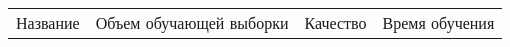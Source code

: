\begin{tabular}{|c|c|c|c|}
	\hline
	Название & Объем обучающей выборки & Качество & Время обучения \\
\end{tabular}